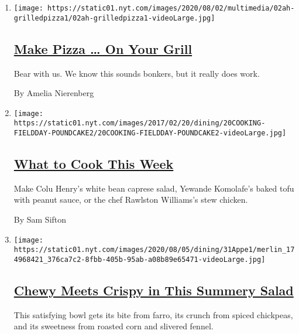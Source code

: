 \begin{enumerate}
\def\labelenumi{\arabic{enumi}.}
\item
  \texttt{[image: https://static01.nyt.com/images/2020/08/02/multimedia/02ah-grilledpizza1/02ah-grilledpizza1-videoLarge.jpg]}

  \hypertarget{make-pizza--on-your-grill}{%
  \subsection{\texorpdfstring{\href{/2020/08/01/at-home/coronavirus-make-pizza-on-a-grill.html}{Make
  Pizza \ldots{} On Your
  Grill}}{Make Pizza \ldots{} On Your Grill}}\label{make-pizza--on-your-grill}}

  Bear with us. We know this sounds bonkers, but it really does work.

  By Amelia Nierenberg
\item
  \texttt{[image: https://static01.nyt.com/images/2017/02/20/dining/20COOKING-FIELDDAY-POUNDCAKE2/20COOKING-FIELDDAY-POUNDCAKE2-videoLarge.jpg]}

  \hypertarget{what-to-cook-this-week}{%
  \subsection{\texorpdfstring{\href{/2020/08/02/dining/what-to-cook-this-week.html}{What
  to Cook This
  Week}}{What to Cook This Week}}\label{what-to-cook-this-week}}

  Make Colu Henry's white bean caprese salad, Yewande Komolafe's baked
  tofu with peanut sauce, or the chef Rawlston Williams's stew chicken.

  By Sam Sifton
\item
  \texttt{[image: https://static01.nyt.com/images/2020/08/05/dining/31Appe1/merlin\_174968421\_376ca7c2-8fbb-405b-95ab-a08b89e65471-videoLarge.jpg]}

  \hypertarget{chewy-meets-crispy-in-this-summery-salad}{%
  \subsection{\texorpdfstring{\href{/2020/07/31/dining/farro-corn-chickpea-salad-recipe.html}{Chewy
  Meets Crispy in This Summery
  Salad}}{Chewy Meets Crispy in This Summery Salad}}\label{chewy-meets-crispy-in-this-summery-salad}}

  This satisfying bowl gets its bite from farro, its crunch from spiced
  chickpeas, and its sweetness from roasted corn and slivered fennel.


\end{enumerate}

